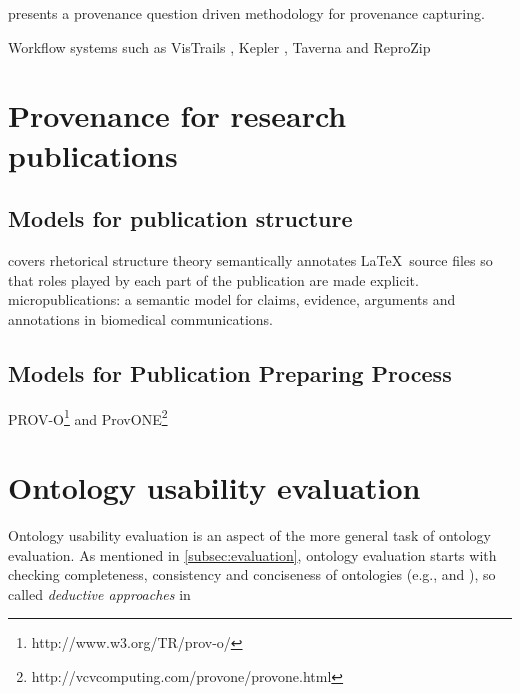 \cite{miles2011prime} presents a provenance question driven methodology for provenance capturing.

Workflow systems such as VisTrails \cite{freire2014reproducibility}, Kepler \cite{ludascher2006scientific}, Taverna \cite{wolstencroft2013taverna} and ReproZip \cite{chirigati2013reprozip} %

\section{Provenance for research publications}
\subsection{Models for publication structure}
\cite{taboada2006rhetorical} covers rhetorical structure theory
\cite{groza2007salt} semantically annotates \LaTeX \ source files so that roles played by each part of the publication are made explicit.
\cite{clark2013micropublications} micropublications: a semantic model for claims, evidence, arguments and annotations in biomedical communications.

\subsection{Models for Publication Preparing Process}
PROV-O\footnote{http://www.w3.org/TR/prov-o/} and ProvONE\footnote{http://vcvcomputing.com/provone/provone.html} %

\section{Ontology usability evaluation}
Ontology usability evaluation is an aspect of the more general task of ontology evaluation. As mentioned in \ref{subsec:evaluation}, ontology evaluation starts with checking completeness, consistency and conciseness of ontologies (e.g., \cite{gruninger1995methodology} and \cite{gomez2001evaluation}), so called \emph{deductive approaches} in 

